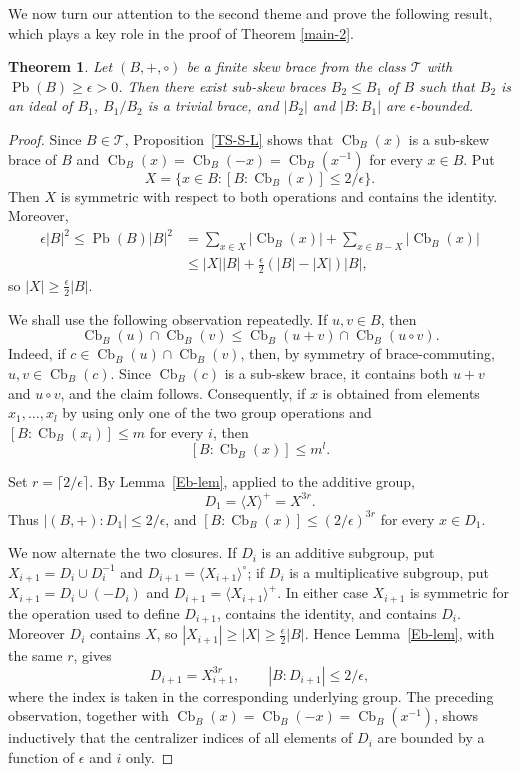\documentclass[11pt, oneside]{amsart}
\numberwithin{equation}{section}
\theoremstyle{plain}
\newtheorem{thm}[equation]{Theorem}
\theoremstyle{definition}
\newcommand{\Cb}{\operatorname{Cb} }
\newcommand{\Pb}{\operatorname{Pb} }
\begin{document}
We now turn our attention to the second theme and prove the following result, which plays a key role in the proof of Theorem \ref{main-2}.  
\begin{thm}\label{maintheorem}
    Let $(B,+,\circ)$ be a finite skew brace from the class $\mathcal{T}$ with $\Pb(B)\geqslant \epsilon > 0$. Then there exist sub-skew braces $B_2 \leqslant B_1$ of  $B$ such that $B_2$ is an ideal of $B_1$, $B_1/B_2$ is a trivial brace, and $|B_2|$ and $|B:B_1|$ are $\epsilon$-bounded.
\end{thm}
\begin{proof}
Since $B\in\mathcal T$, Proposition~\ref{TS-S-L} shows that $\Cb_B(x)$ is a sub-skew brace of $B$ and
$\Cb_B(x)=\Cb_B(-x)=\Cb_B(x^{-1})$ for every $x\in B$. Put
$$
X=\{x\in B:[B:\Cb_B(x)]\leqslant 2/\epsilon\}.
$$
Then $X$ is symmetric with respect to both operations and contains the identity. Moreover,
\begin{align*}
\epsilon|B|^2\leqslant \Pb(B)|B|^2
&=\sum_{x\in X}|\Cb_B(x)|+\sum_{x\in B-X}|\Cb_B(x)|\\
&\leqslant |X||B|+\frac{\epsilon}{2}(|B|-|X|)|B|,
\end{align*}
so $|X|\geqslant \frac{\epsilon}{2}|B|$.

We shall use the following observation repeatedly. If $u,v\in B$, then
$$
\Cb_B(u)\cap\Cb_B(v)\leqslant \Cb_B(u+v)\cap\Cb_B(u\circ v).
$$
Indeed, if $c\in\Cb_B(u)\cap\Cb_B(v)$, then, by symmetry of brace-commuting, $u,v\in\Cb_B(c)$. Since $\Cb_B(c)$ is a sub-skew brace, it contains both $u+v$ and $u\circ v$, and the claim follows. Consequently, if $x$ is obtained from elements $x_1,\ldots,x_l$ by using only one of the two group operations and $[B:\Cb_B(x_i)]\leqslant m$ for every $i$, then
$$
[B:\Cb_B(x)]\leqslant m^l.
$$

Set $r=\lceil2/\epsilon\rceil$. By Lemma~\ref{Eb-lem}, applied to the additive group,
$$
D_1=\langle X\rangle^+=X^{3r}.
$$
Thus $|(B,+):D_1|\leqslant 2/\epsilon$, and
$[B:\Cb_B(x)]\leqslant(2/\epsilon)^{3r}$ for every $x\in D_1$.

We now alternate the two closures. If $D_i$ is an additive subgroup, put
$X_{i+1}=D_i\cup D_i^{-1}$ and $D_{i+1}=\langle X_{i+1}\rangle^\circ$; if $D_i$ is a multiplicative subgroup, put
$X_{i+1}=D_i\cup(-D_i)$ and $D_{i+1}=\langle X_{i+1}\rangle^+$. In either case $X_{i+1}$ is symmetric for the operation used to define $D_{i+1}$, contains the identity, and contains $D_i$. Moreover $D_i$ contains $X$, so
$|X_{i+1}|\geqslant|X|\geqslant\frac{\epsilon}{2}|B|$. Hence Lemma~\ref{Eb-lem}, with the same $r$, gives
$$
D_{i+1}=X_{i+1}^{3r},
\qquad
|B:D_{i+1}|\leqslant 2/\epsilon,
$$
where the index is taken in the corresponding underlying group. The preceding observation, together with
$\Cb_B(x)=\Cb_B(-x)=\Cb_B(x^{-1})$, shows inductively that the centralizer indices of all elements of $D_i$ are bounded by a function of $\epsilon$ and $i$ only.


\end{proof}
\end{document}
